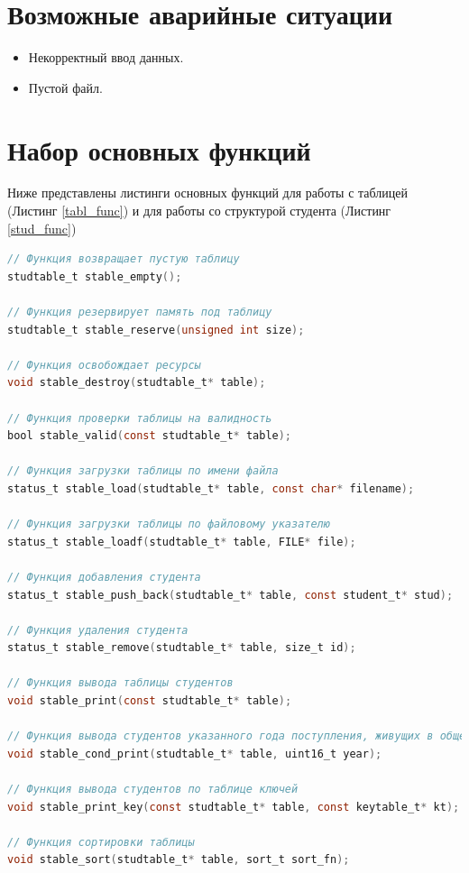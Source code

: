 \section{Возможные аварийные ситуации}
\begin{itemize}
	\item Некорректный ввод данных.
	\item Пустой файл.
\end{itemize}

\section{Набор основных функций}

Ниже представлены листинги основных функций для работы с таблицей (Листинг \ref{tabl_func}) и для работы со структурой студента (Листинг \ref{stud_func})

\begin{lstlisting}[label=tabl_func,language=C,caption=Набор функций для работы с таблицей]
// Функция возвращает пустую таблицу
studtable_t stable_empty();

// Функция резервирует память под таблицу
studtable_t stable_reserve(unsigned int size);

// Функция освобождает ресурсы
void stable_destroy(studtable_t* table);

// Функция проверки таблицы на валидность
bool stable_valid(const studtable_t* table);

// Функция загрузки таблицы по имени файла
status_t stable_load(studtable_t* table, const char* filename);

// Функция загрузки таблицы по файловому указателю
status_t stable_loadf(studtable_t* table, FILE* file);

// Функция добавления студента
status_t stable_push_back(studtable_t* table, const student_t* stud);

// Функция удаления студента
status_t stable_remove(studtable_t* table, size_t id);

// Функция вывода таблицы студентов
void stable_print(const studtable_t* table);

// Функция вывода студентов указанного года поступления, живущих в общежитии
void stable_cond_print(studtable_t* table, uint16_t year);

// Функция вывода студентов по таблице ключей
void stable_print_key(const studtable_t* table, const keytable_t* kt);

// Функция сортировки таблицы
void stable_sort(studtable_t* table, sort_t sort_fn);
\end{lstlisting}

